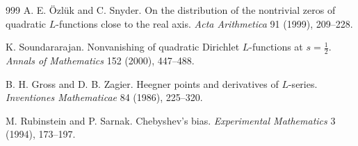 \begin{thebibliography}{999}
 A. E. \"Ozl\"uk and C. Snyder. On the distribution of the nontrivial zeros of quadratic $L$-functions close to the real axis. \emph{Acta Arithmetica} 91 (1999), 209--228.

 K. Soundararajan. Nonvanishing of quadratic Dirichlet $L$-functions at $s=\frac12$. \emph{Annals of Mathematics} 152 (2000), 447--488.

 B. H. Gross and D. B. Zagier. Heegner points and derivatives of $L$-series. \emph{Inventiones Mathematicae} 84 (1986), 225--320.

 M. Rubinstein and P. Sarnak. Chebyshev's bias. \emph{Experimental Mathematics} 3 (1994), 173--197.


\end{thebibliography}
